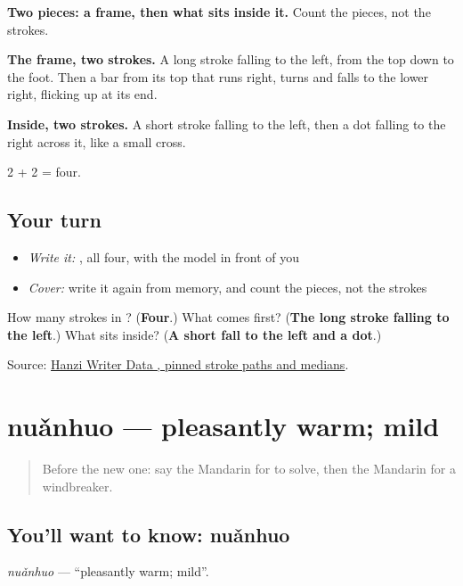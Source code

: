 \begin{quote}
\end{quote}

\textbf{Two pieces: a frame, then what sits inside it.} Count the pieces, not the strokes.

\textbf{The frame, two strokes.} A long stroke falling to the left, from the top down to the foot. Then a bar from its top that runs right, turns and falls to the lower right, flicking up at its end.

\textbf{Inside, two strokes.} A short stroke falling to the left, then a dot falling to the right across it, like a small cross.

2 + 2 = four.

\subsection*{Your turn}
\begin{itemize}
\raggedright
  \item \emph{Write it:} , all four, with the model in front of you
  \item \emph{Cover:} write it again from memory, and count the pieces, not the strokes
\end{itemize}

\begin{tcolorbox}[breakable,colback=teal!4,colframe=teal!35!black,title={Before you move on}]
How many strokes in ? (\textbf{Four}.) What comes first? (\textbf{The long stroke falling to the left}.) What sits inside? (\textbf{A short fall to the left and a dot}.)

Source: \href{https://raw.githubusercontent.com/chanind/hanzi-writer-data/68d10a4b21150cae5e1ebbd223eed289cf32d90c/data/\%E9\%A3\%8E.json}{Hanzi Writer Data , pinned stroke paths and medians}.
\end{tcolorbox}
\section[nuǎnhuo]{nuǎnhuo — pleasantly warm; mild}

\label{lesson:ZH-C218-nuanhuo}



\begin{quote}
Before the new one: say the Mandarin for to solve, then the Mandarin for a windbreaker.
\end{quote}

\subsection*{You'll want to know: nuǎnhuo}
\emph{nuǎnhuo} — \textquotedblleft{}pleasantly warm; mild\textquotedblright{}.

